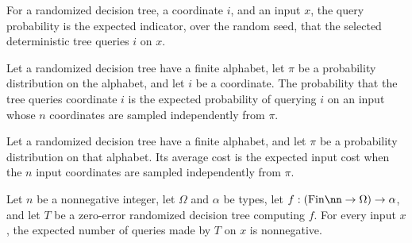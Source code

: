\begin{definition}
\label{FABL.RandomizedDecisionTree.queryProbabilityOnInput}
\leanok
{}
For a randomized decision tree, a coordinate $i$, and an input $x$, the query
probability is the expected indicator, over the random seed, that the selected
deterministic tree queries $i$ on $x$.
\end{definition}

\begin{definition}
\label{FABL.RandomizedDecisionTree.queryProbability}
\leanok
{}
Let a randomized decision tree have a finite alphabet, let $\pi$ be a probability
distribution on the alphabet, and let $i$ be a coordinate. The probability that the tree
queries coordinate $i$ is the expected probability of querying $i$ on an input whose $n$
coordinates are sampled independently from $\pi$.
\end{definition}

\begin{definition}
\label{FABL.RandomizedDecisionTree.averageCost}
\leanok
{}
Let a randomized decision tree have a finite alphabet, and let $\pi$ be a probability
distribution on that alphabet. Its average cost is the expected input cost when the $n$
input coordinates are sampled independently from $\pi$.
\end{definition}

\begin{theorem}
\label{FABL.RandomizedDecisionTree.inputCost_nonneg}
\leanok
{}
Let $n$ be a nonnegative integer, let $\Omega$ and $\alpha$ be types, let $f:(\mathrm{Fin}\nn\to\Omega)\to\alpha$, and let $T$ be a zero-error randomized decision tree computing
$f$. For every input $x$, the expected number of queries made by $T$ on $x$ is
nonnegative.
\end{theorem}

